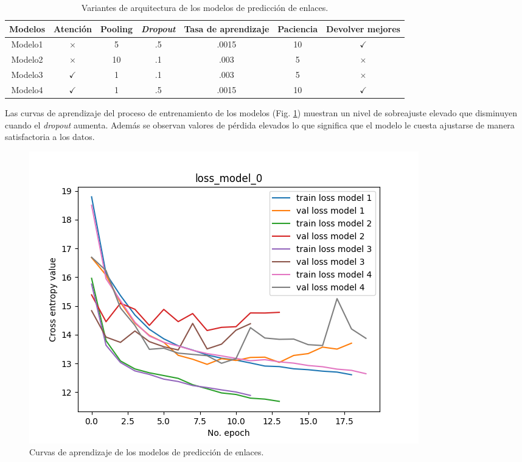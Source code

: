 \begin{table}[h!]
	\begin{center}
		\begin{tabular}{|c|c|c|c|c|c|c|} \hline
		Modelos  & Atención      & Pooling  & \emph{Dropout}   & Tasa de aprendizaje & Paciencia & Devolver mejores     \\ \hline
		Modelo1	 & $\times$	     &  5       & .5               & .0015               & 10	      & $\checkmark$        \\ \hline
		Modelo2	 & $\times$	 	 & 10       & .1               & .003                & 5	      & $\times$            \\ \hline
		Modelo3	 & $\checkmark$	 &  1       & .1               & .003                & 5	      & $\times$            \\ \hline
		Modelo4	 & $\checkmark$	 &  1       & .5               & .0015               & 10	      & $\checkmark$        \\ \hline
		\end{tabular}
	\caption{Variantes de arquitectura de los modelos de predicción de enlaces.}\label{table:link_predictor_architecture_table}
	\end{center}
\end{table}

Las curvas de aprendizaje del proceso de entrenamiento de los modelos (Fig. \ref{fig:link_prediction_model_loss}) 
muestran un nivel de sobreajuste 
elevado que disminuyen cuando el \emph{dropout} aumenta. Además se observan valores de pérdida elevados lo que significa 
que el modelo le cuesta ajustarse de manera satisfactoria a los datos.

\begin{figure}[h!]
	\begin{center}
		\includegraphics[scale=.7]{Graphics/persuassive_essays_all_linked_link_prediction_loss_model_1.png}
	    \caption{Curvas de aprendizaje de los modelos de predicción de enlaces.}\label{fig:link_prediction_model_loss}
	\end{center}
\end{figure}

